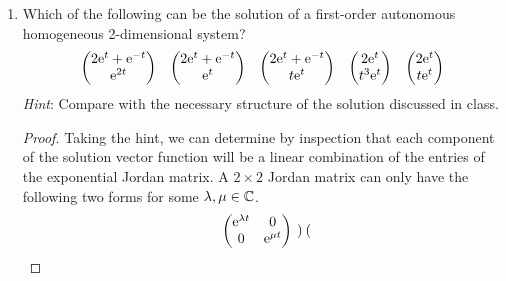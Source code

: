 \documentclass[../psets.tex]{subfiles}
\begin{document}
\begin{enumerate}
\begin{proof}
\begin{align*}
\begin{pmatrix}
                \end{pmatrix}
            \right]
        \end{align*}
        as desired.
    \end{proof}
    \item Which of the following can be the solution of a first-order autonomous homogeneous 2-dimensional system?
    \begin{align*}
        \begin{pmatrix}
            2\e[t]+\e[-t]\\
            \e[2t]\\
        \end{pmatrix}&&
        \begin{pmatrix}
            2\e[t]+\e[-t]\\
            \e[t]\\
        \end{pmatrix}&&
        \begin{pmatrix}
            2\e[t]+\e[-t]\\
            t\e[t]\\
        \end{pmatrix}&&
        \begin{pmatrix}
            2\e[t]\\
            t^3\e[t]\\
        \end{pmatrix}&&
        \begin{pmatrix}
            2\e[t]\\
            t\e[t]\\
        \end{pmatrix}
    \end{align*}
    \emph{Hint}: Compare with the necessary structure of the solution discussed in class.
    \begin{proof}
        Taking the hint, we can determine by inspection that each component of the solution vector function will be a linear combination of the entries of the exponential Jordan matrix. A $2\times 2$ Jordan matrix can only have the following two forms for some $\lambda,\mu\in\C$.
        \begin{align*}
            \begin{pmatrix}
                \e[\lambda t] & 0\\
                0 & \e[\mu t]\\
            \end{pmatrix}&&
            \begin{pmatrix}

\end{pmatrix}
\end{align*}
\end{proof}
\end{enumerate}
\end{document}
